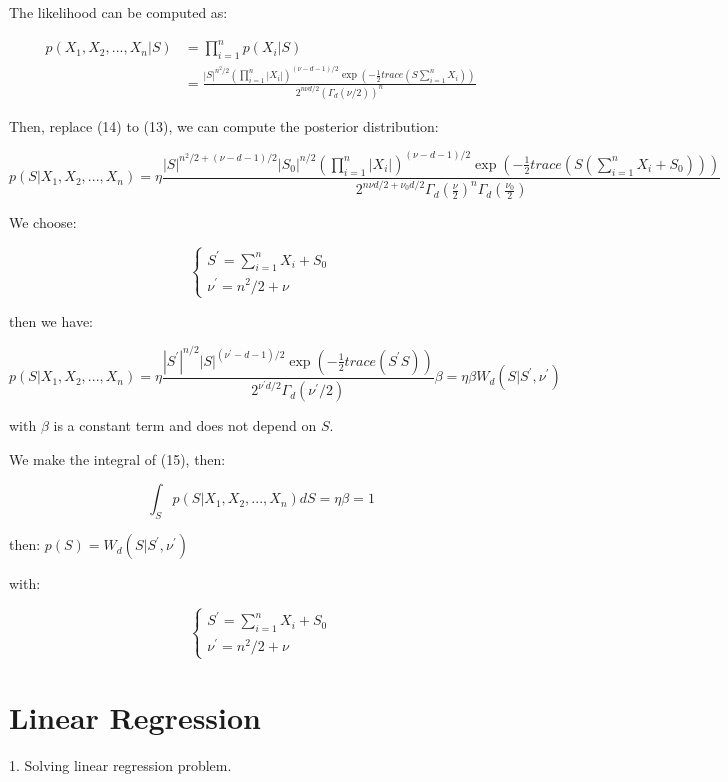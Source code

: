 \documentclass{article}
\begin{document}
The likelihood can be computed as:

\begin{equation}
    \begin{aligned}
        p(X_1,X_2,...,X_n|S)&=\prod_{i=1}^np(X_i|S)\\
        &=\frac{|S|^{n^2/2}(\prod_{i=1}^n|X_i|)^{(\nu-d-1)/2}\exp(-\frac{1}{2}trace(S\sum_{i=1}^nX_i))}{2^{n\nu d/2}(\Gamma_d(\nu/2))^n}
    \end{aligned}
\end{equation}

Then, replace (14) to (13), we can compute the posterior distribution:

$$
p(S|X_1,X_2,...,X_n) = \eta \frac{|S|^{n^2/2+(\nu-d-1)/2}|S_0|^{n/2}(\prod_{i=1}^n|X_i|)^{(\nu-d-1)/2}\exp(-\frac{1}{2}trace(S(\sum_{i=1}^nX_i+S_0)))}{2^{n\nu d/2+\nu_0 d/2}\Gamma_d(\frac{\nu}{2})^n\Gamma_d(\frac{\nu_0}{2})}
$$

We choose:

$$
\begin{cases}
    S^{\prime} = \sum_{i=1}^nX_i+S_0\\
    \nu^{\prime} = n^2/2+\nu
\end{cases}
$$

then we have:

\begin{equation}
    p(S|X_1,X_2,...,X_n) = \eta \frac{|S^{\prime}|^{n/2}|S|^{(\nu^{\prime}-d-1)/2}\exp(-\frac{1}{2}trace(S^{\prime}S))}{2^{\nu^{\prime}d/2}\Gamma_d(\nu^{\prime}/2)}\beta=\eta\beta W_d(S|S^{\prime},\nu^{\prime})
\end{equation}

with $\beta$ is a constant term and does not depend on $S$.

We make the integral of (15), then:

$$
\int_{S}p(S|X_1,X_2,...,X_n)dS = \eta\beta=1
$$

then: $p(S) = W_{d}(S|S^{\prime},\nu^{\prime})$

with:

$$
\begin{cases}
    S^{\prime} = \sum_{i=1}^nX_i+S_0\\
    \nu^{\prime}=n^2/2+\nu
\end{cases}
$$

\section{Linear Regression}

1. Solving linear regression problem.
\end{document}
